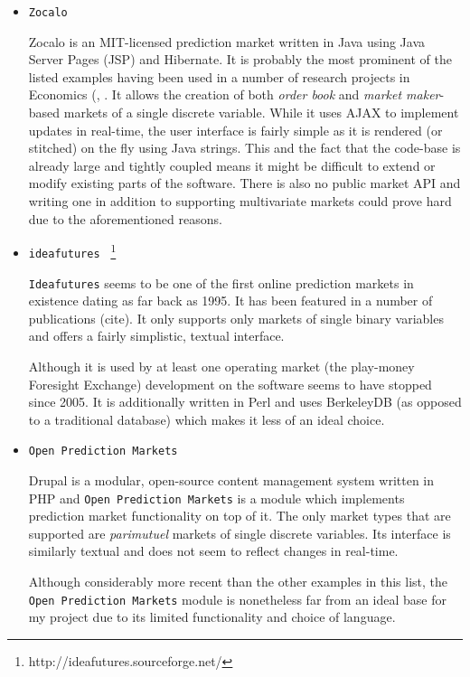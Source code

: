\documentclass[bsc,frontabs,twoside,singlespacing,parskip,deptreport]{infthesis}     %
\begin{document}
\begin{itemize}

\item {\tt Zocalo}

    Zocalo is an MIT-licensed prediction market written in Java using Java Server Pages (JSP) and Hibernate. It is probably the most prominent of the listed examples having been used in a number of research projects in Economics (\cite{carver_architecture_2008}, \cite{chang_simulating_2009}. It allows the creation of both {\em order book} and {\em market maker}-based markets of a single discrete variable. While it uses AJAX to implement updates in real-time, the user interface is fairly simple as it is rendered (or stitched) on the fly using Java strings. This and the fact that the code-base is already large and tightly coupled means it might be difficult to extend or modify existing parts of the software. There is also no public market API and writing one in addition to supporting multivariate markets could prove hard due to the aforementioned reasons.

\item {\tt ideafutures } \footnote{http://ideafutures.sourceforge.net/}

    {\tt Ideafutures} seems to be one of the first online prediction markets in existence dating as far back as 1995. It has been featured in a number of publications (cite). It only supports only markets of single binary variables and offers a fairly simplistic, textual interface.

Although it is used by at least one operating market (the play-money Foresight Exchange) development on the software seems to have stopped since 2005. It is additionally written in Perl and uses BerkeleyDB (as opposed to a traditional database) which makes it less of an ideal choice.

\item {\tt Open Prediction Markets}

    Drupal is a modular, open-source content management system written in PHP and {\tt Open Prediction Markets} is a module which implements prediction market functionality on top of it. The only market types that are  supported are {\em parimutuel} markets of single discrete variables. Its interface is similarly textual and does not seem to reflect changes in real-time.
    
    Although considerably more recent than the other examples in this list, the {\tt Open Prediction Markets} module is nonetheless far from an ideal base for my project due to its limited functionality and choice of language.
    
\end{itemize}
\end{document}
